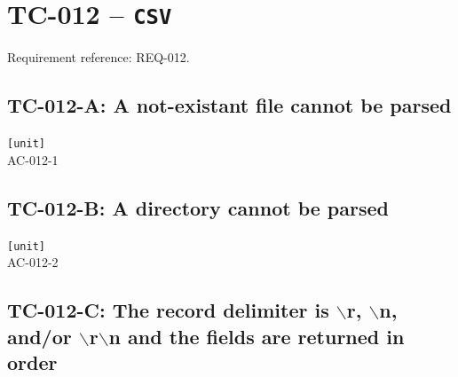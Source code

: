 \section{TC-012 -- \texttt{CSV}}
\label{sec:tc012}

Requirement reference: REQ-012.

\subsection{TC-012-A: A not-existant file cannot be parsed}

\begin{tcbox}
 \texttt{[unit]}\\
 AC-012-1

\medskip
\given{}
\end{tcbox}

\subsection{TC-012-B: A directory cannot be parsed}

\begin{tcbox}
 \texttt{[unit]}\\
 AC-012-2

\medskip
{}
\end{tcbox}

\subsection{TC-012-C: The record delimiter is $\backslash$r, $\backslash$n, and/or $\backslash$r$\backslash$n and the fields are returned in order}

